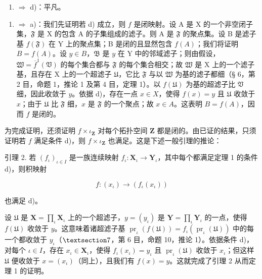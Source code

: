 \begin{enumerate}
\def\labelenumi{\alph{enumi})}
\setcounter{enumi}{2}
\tightlist
\item
  \(\Longrightarrow\) d)：平凡。
\end{enumerate}

\begin{enumerate}
\def\labelenumi{\alph{enumi})}
\setcounter{enumi}{3}
\tightlist
\item
  \(\Longrightarrow\) a)：我们先证明若 d) 成立，则 \(f\) 是闭映射。设 A 是 X 的一个非空闭子集，\(\mathfrak{F}\) 是 X 的包含 A 的子集组成的滤子。则 A 是 \(\mathfrak{F}\) 的聚点集。设 B 是滤子基 \(f(\mathfrak{F})\) 在 Y 上的聚点集；B 是闭的且显然包含 \(f(A)\)；我们将证明 \(B = f(A)\)。设 \(y \in B\)，\(\mathfrak{B}\) 是 \(y\) 在 Y 中的邻域滤子；则由假设，\(\mathfrak{W} = \overline{f}^{1}(\mathfrak{V})\) 的每个集合都与 \(\mathfrak{F}\) 的每个集合相交；故 \(\mathfrak{W}\) 是 X 上的一个滤子基，且存在 X 上的一个超滤子 \(\mathfrak{U}\)，它比 \(\mathfrak{F}\) 与以 \(\mathfrak{W}\) 为基的滤子都细（§ 6，第 2 目，命题 1，推论 1 及第 4 目，定理 1）。以 \(f(\mathfrak{U})\) 为基的超滤子比 \(\mathfrak{V}\) 细，因此收敛于 \(y\)。依据 d)，存在一点 \(x \in X\)，使得 \(f(x) = y\) 且 \(\mathfrak{U}\) 收敛于 \(x\)；由于 \(\mathfrak{U}\) 比 \(\mathfrak{F}\) 细，\(x\) 是 \(\mathfrak{F}\) 的一个聚点；故 \(x \in A\)。这表明 \(B = f(A)\)，因而 \(f\) 是闭的。
\end{enumerate}

为完成证明，还须证明 \(f \times \iota_{\mathbf{Z}}\) 对每个拓扑空间 \(\mathbf{Z}\) 都是闭的。由已证的结果，只须证明若 \(f\) 满足条件 d)，则 \(f \times \iota_{\mathbf{Z}}\) 也满足。这是下述一般引理的推论：

引理 2. 若 \((f_{\iota})_{\iota\in I}\) 是一族连续映射 \(f_{\iota}:\mathbf{X}_{\iota}\to \mathbf{Y}_{\iota}\)，其中每个都满足定理 1 的条件 d)，则积映射

\[
f: (x _ {\iota}) \rightarrow (f _ {\iota} (x _ {\iota}))
\]

也满足 d)。

设 \(\mathfrak{U}\) 是 \(\mathbf{X} = \prod_{\iota} \mathbf{X}_{\iota}\) 上的一个超滤子，\(y = (y_{\iota})\) 是 \(\mathbf{Y} = \prod_{\iota} \mathbf{Y}_{\iota}\) 的一点，使得 \(f(\mathfrak{U})\) 收敛于 \(y\)。这意味着诸超滤子基 \(\operatorname{pr}_{\iota}(f(\mathfrak{U})) = f_{\iota} (\operatorname{pr}_{\iota}(\mathfrak{U}))\) 中的每一个都收敛于 \(y_{\iota}\)（\(\S 7\)，第 6 目，命题 10，推论 1）。依据条件 d)，对每个 \(\iota \in I\)，存在 \(x_{\iota} \in \mathbf{X}_{\iota}\)，使得 \(f_{\iota}(x_{\iota}) = y_{\iota}\) 且 \(\operatorname{pr}_{\iota}(\mathfrak{U})\) 收敛于 \(x_{\iota}\)；但这样 \(\mathfrak{U}\) 便收敛于 \(x = (x_{\iota})\)（同上），且我们有 \(f(x) = y\)。这就完成了引理 2 从而定理 1 的证明。

